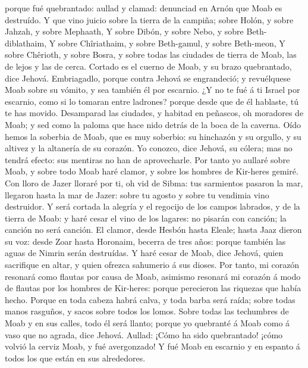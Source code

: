 porque fué quebrantado: aullad y clamad: denunciad en Arnón que Moab es
destruído.  Y que vino juicio sobre la tierra de la
campiña; sobre Holón, y sobre Jahzah, y sobre Mephaath,  Y
sobre Dibón, y sobre Nebo, y sobre Beth-diblathaim,  Y
sobre Chîriathaim, y sobre Beth-gamul, y sobre Beth-meon, 
Y sobre Chêrioth, y sobre Bosra, y sobre todas las ciudades de tierra de
Moab, las de lejos y las de cerca.  Cortado es el cuerno de
Moab, y su brazo quebrantado, dice Jehová.  Embriagadlo,
porque contra Jehová se engrandeció; y revuélquese Moab sobre su vómito,
y sea también él por escarnio.  ¿Y no te fué á ti Israel
por escarnio, como si lo tomaran entre ladrones? porque desde que de él
hablaste, tú te has movido.  Desamparad las ciudades, y
habitad en peñascos, oh moradores de Moab; y sed como la paloma que hace
nido detrás de la boca de la caverna.  Oído hemos la
soberbia de Moab, que es muy soberbio: su hinchazón y su orgullo, y su
altivez y la altanería de su corazón.  Yo conozco, dice
Jehová, su cólera; mas no tendrá efecto: sus mentiras no han de
aprovecharle.  Por tanto yo aullaré sobre Moab, y sobre
todo Moab haré clamor, y sobre los hombres de Kir-heres gemiré.
 Con lloro de Jazer lloraré por ti, oh vid de Sibma: tus
sarmientos pasaron la mar, llegaron hasta la mar de Jazer: sobre tu
agosto y sobre tu vendimia vino destruidor.  Y será cortada
la alegría y el regocijo de los campos labrados, y de la tierra de Moab:
y haré cesar el vino de los lagares: no pisarán con canción; la canción
no será canción.  El clamor, desde Hesbón hasta Eleale;
hasta Jaaz dieron su voz: desde Zoar hasta Horonaim, becerra de tres
años: porque también las aguas de Nimrin serán destruídas. 
Y haré cesar de Moab, dice Jehová, quien sacrifique en altar, y quien
ofrezca sahumerio á sus dioses.  Por tanto, mi corazón
resonará como flautas por causa de Moab, asimismo resonará mi corazón á
modo de flautas por los hombres de Kir-heres: porque perecieron las
riquezas que había hecho.  Porque en toda cabeza habrá
calva, y toda barba será raída; sobre todas manos rasguños, y sacos
sobre todos los lomos.  Sobre todas las techumbres de Moab
y en sus calles, todo él será llanto; porque yo quebranté á Moab como á
vaso que no agrada, dice Jehová.  Aullad: ¡Cómo ha sido
quebrantado! ¡cómo volvió la cerviz Moab, y fué avergonzado! Y fué Moab
en escarnio y en espanto á todos los que están en sus alrededores.
